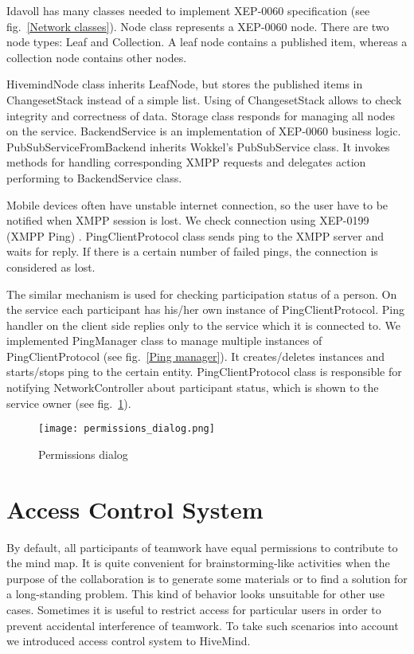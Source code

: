 Idavoll has many classes needed to implement XEP-0060 specification (see
fig.~\ref{Network classes}). Node class represents a XEP-0060 node. There are
two node types: Leaf and Collection. A leaf node contains a published item,
whereas a collection node contains other nodes.

HivemindNode class inherits LeafNode, but stores the published items in
ChangesetStack instead of a simple list. Using of ChangesetStack allows to check
integrity and correctness of data. Storage class responds for managing all nodes
on the service. BackendService is an implementation of XEP-0060 business logic.
PubSubServiceFromBackend inherits Wokkel's PubSubService class. It invokes
methods for handling corresponding XMPP requests and delegates action performing
to BackendService class.

Mobile devices often have unstable internet connection, so the user have to be
notified when XMPP session is lost. We check connection using XEP-0199 (XMPP
Ping) \cite{ping-xep-0199}. PingClientProtocol class sends ping to the XMPP
server and waits for reply. If there is a certain number of failed pings, the
connection is considered as lost.

The similar mechanism is used for checking participation status of a person. On
the service each participant has his/her own instance of PingClientProtocol. Ping
handler on the client side replies only to the service which it is connected
to. We implemented PingManager class to manage multiple instances of
PingClientProtocol (see fig.~\ref{Ping manager}).  It creates/deletes instances
and starts/stops ping to the certain entity. PingClientProtocol class is
responsible for notifying NetworkController about participant status, which is
shown to the service owner (see fig.~\ref{Permissions dialog}).

\begin{figure}[b] \centering
\texttt{[image: permissions\_dialog.png]}
  \caption{Permissions dialog}
  \label{Permissions dialog}
\end{figure}

\section{Access Control System}
\label{Access control system}

By default, all participants of teamwork have equal permissions to contribute to
the mind map. It is quite convenient for brainstorming-like activities when the
purpose of the collaboration is to generate some materials or to find a solution
for a long-standing problem. This kind of behavior looks unsuitable for other
use cases. Sometimes it is useful to restrict access for particular users in
order to prevent accidental interference of teamwork. To take such scenarios
into account we introduced access control system to HiveMind.

